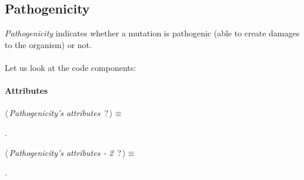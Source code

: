 \subsection{Pathogenicity}
\emph{Pathogenicity} indicates whether a mutation is pathogenic (able to create damages to the organism) or not.
\\
\\Let us look at the code components:

\paragraph{Attributes}      

	\begin{flushleft} \small
\begin{minipage}{\linewidth}\label{scrap8}\raggedright\small
{} $\langle\,${\itshape {Pathogenicity's attributes}}\nobreak\ {\footnotesize {?}}$\,\rangle\equiv$
\vspace{-1ex}
\begin{list}{}{} \item

                
        {\NWsep}
\end{list}
\vspace{-1.5ex}
\footnotesize
\begin{list}{}{\setlength{\itemsep}{-\parsep}\setlength{\itemindent}{-\leftmargin}}
\item {\NWtxtMacroNoRef}.

\item{}
\end{list}
\end{minipage}\vspace{4ex}
\end{flushleft}
\begin{flushleft} \small
\begin{minipage}{\linewidth}\label{scrap9}\raggedright\small
{} $\langle\,${\itshape {Pathogenicity's attributes - 2}}\nobreak\ {\footnotesize {?}}$\,\rangle\equiv$
\vspace{-1ex}
\begin{list}{}{} \item

                
        {\NWsep}
\end{list}
\vspace{-1.5ex}
\footnotesize
\begin{list}{}{\setlength{\itemsep}{-\parsep}\setlength{\itemindent}{-\leftmargin}}
\item {\NWtxtMacroNoRef}.

\item{}
\end{list}
\end{minipage}\vspace{4ex}
\end{flushleft}
